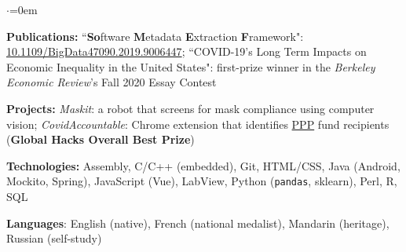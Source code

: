 \begin{list}{$\cdot$}{\leftmargin=0em} %
   \item \textbf{Publications:} ``\textbf{So}ftware \textbf{M}etadata \textbf{E}xtraction \textbf{F}ramework": \href{https://doi.org/10.1109/BigData47090.2019.9006447}{10.1109/BigData47090.2019.9006447}; ``COVID-19’s Long Term Impacts on Economic Inequality in the United States": first-prize winner in the \textit{Berkeley Economic Review}'s Fall 2020 Essay Contest
   \item \textbf{Projects:} \textit{Maskit}: a robot that screens for mask compliance using computer vision; \textit{CovidAccountable}: Chrome extension that identifies \href{https://web.archive.org/web/20200903224716/https://www.sba.gov/funding-programs/loans/coronavirus-relief-options/paycheck-protection-program}{PPP} fund recipients (\textbf{Global Hacks Overall Best Prize})%
   \item \textbf{Technologies:} Assembly, C/C++ (embedded), Git, HTML/CSS, Java (Android, Mockito, Spring), JavaScript (Vue), LabView, Python (\texttt{pandas}, sklearn), Perl, R, SQL
   \item \textbf{Languages}: English (native), French (national medalist), Mandarin (heritage), Russian (self-study)
\end{list}
